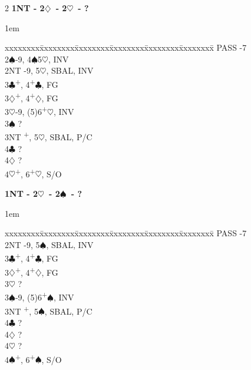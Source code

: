 \documentclass[10pt]{article}
\renewcommand{\c}{$\clubsuit$}
\renewcommand{\d}{$\diamondsuit$}
\newcommand{\h}{$\heartsuit$}
\newcommand{\s}{$\spadesuit$}
\newcommand{\p}{\textsuperscript{+}}
\newenvironment{bidtable}[1][]
{\textbf{#1}
  \begin{adjustwidth}{1em}{}
    \addvspace{2pt}
    \begin{tabbing}
      xxxxxxxx\=xxxxxxxx\=xxxxxxxx\=xxxxxxxx\=xxxxxxxx\=xxxxxxxx\=\kill}
{\end{tabbing}\end{adjustwidth}\bigskip}%
\begin{document}
\begin{multicols*}{2}
\begin{bidtable}[1NT - 2\d\ - 2\h\ - ?]
PASS -7                  \\
2\s  {}-9, 4\s 5\h, INV    \\
2NT  -9, 5\h, SBAL, INV  \\
3\c  {}\p, 4\p\c, FG      \\
3\d  {}\p, 4\p\d, FG      \\
3\h  {}-9, (5)6\p\h, INV   \\
3\s  \> ?                    \\
3NT  \p, 5\h, SBAL, P/C \\
4\c  \> ?                    \\
4\d  \> ?                    \\
4\h  {}\p, 6\p\h, S/O
\end{bidtable}

\begin{bidtable}[1NT - 2\h\ - 2\s\ - ?]
PASS -7                  \\
2NT  -9, 5\s, SBAL, INV  \\
3\c  {}\p, 4\p\c, FG      \\
3\d  {}\p, 4\p\d, FG      \\
3\h  \> ?                    \\
3\s  {}-9, (5)6\p\s, INV   \\
3NT  \p, 5\s, SBAL, P/C\\
4\c  \> ?                    \\
4\d  \> ?                    \\
4\h  \> ?                    \\
4\s  {}\p, 6\p\s, S/O
\end{bidtable}




\end{multicols*}
\end{document}
